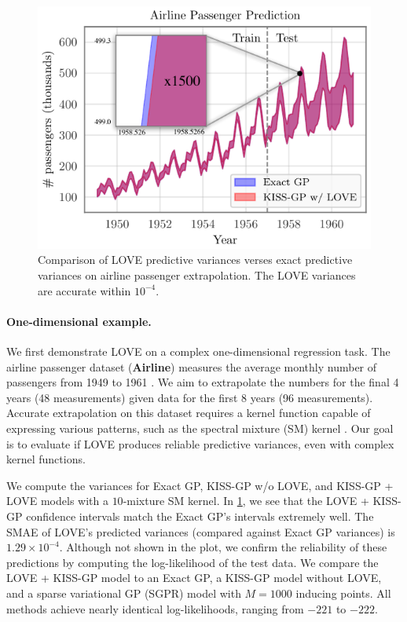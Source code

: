 \begin{figure}[t!]
  \centering
  \includegraphics[width=0.70\columnwidth]{figures/airline_comparison.pdf}
  \caption[Comparison of LOVE predictive variances verses exact predictive variances on airline passenger extrapolation.]{
    Comparison of LOVE predictive variances verses exact predictive variances on airline passenger extrapolation.
    The LOVE{} variances are accurate within $10^{-4}$.
    \label{fig:airline_results}
  }
\end{figure}

\paragraph{One-dimensional example.}
We first demonstrate LOVE{} on a complex one-dimensional regression task.
The airline passenger dataset ({\bf Airline}) measures the average monthly number of passengers from 1949 to 1961 \cite{hyndman2005time}.
We aim to extrapolate the numbers for the final 4 years (48 measurements) given data for the first 8 years (96 measurements).
Accurate extrapolation on this dataset requires a kernel function capable of expressing various patterns, such as the spectral mixture (SM) kernel \cite{wilson2013gaussian}.
Our goal is to evaluate if LOVE{} produces reliable predictive variances, even with complex kernel functions.

We compute the variances for Exact GP, KISS-GP w/o LOVE{}, and KISS-GP + LOVE{} models with a $10$-mixture SM kernel.
In \cref{fig:airline_results}, we see that the LOVE + KISS-GP{} confidence intervals match the Exact GP's intervals extremely well.
The SMAE of LOVE{}'s predicted variances (compared against Exact GP variances) is $1.29 \times 10^{-4}$.
Although not shown in the plot, we confirm the reliability of these predictions by computing the log-likelihood of the test data.
We compare the LOVE + KISS-GP{} model to an Exact GP, a KISS-GP model without LOVE{}, and a sparse variational GP (SGPR) model with $M=1000$ inducing points.
All methods achieve nearly identical log-likelihoods, ranging from $-221$ to $-222$.



